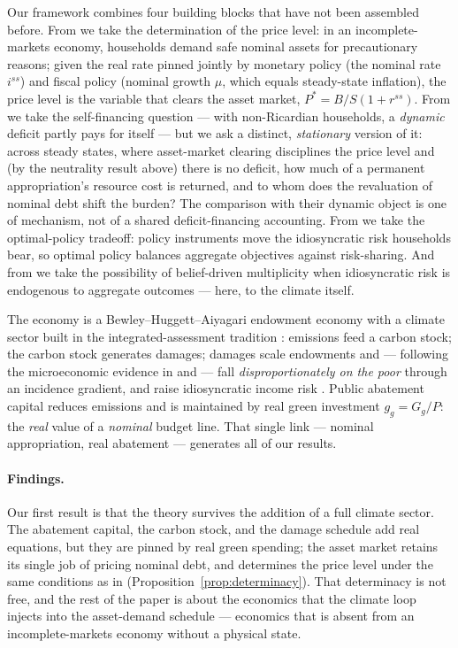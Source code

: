 \documentclass[12pt]{article}
\newcommand{\Sfun}{S}
\begin{document}
Our framework combines four building blocks that have not been assembled
before. From \citet{hagedorn2026dtpl} we take the determination of the price
level: in an incomplete-markets economy, households demand safe nominal assets
for precautionary reasons; given the real rate pinned jointly by monetary
policy (the nominal rate $i^{ss}$) and fiscal policy (nominal growth $\mu$,
which equals steady-state inflation), the price level is the variable that
clears the asset market, $P^{*}=B/\Sfun(1+r^{ss})$. From
\citet{angeletos2024deficits} we take the self-financing question --- with
non-Ricardian households, a \emph{dynamic} deficit partly pays for itself ---
but we ask a distinct, \emph{stationary} version of it: across steady states,
where asset-market clearing disciplines the price level and (by the neutrality
result above) there is no deficit, how much of a permanent appropriation's
resource cost is returned, and to whom does the revaluation of nominal debt
shift the burden? The comparison with their dynamic object is one of
mechanism, not of a shared deficit-financing accounting. From \citet{acharya2023optimal} we take the optimal-policy tradeoff:
policy instruments move the idiosyncratic risk households bear, so optimal
policy balances aggregate objectives against risk-sharing. And from
\citet{acharyabenhabib2024} we take the possibility of belief-driven
multiplicity when idiosyncratic risk is endogenous to aggregate outcomes ---
here, to the climate itself.

The economy is a Bewley--Huggett--Aiyagari endowment economy
\citep{bewley1980,huggett1993,aiyagari1994} with a climate sector built in the
integrated-assessment tradition \citep{golosov2014,nordhaus2017}: emissions
feed a carbon stock; the carbon stock generates damages; damages scale
endowments and --- following the microeconomic evidence in
\citet{kanzig2023carbon} and \citet{fried2018} --- fall
\emph{disproportionately on the poor} through an incidence gradient, and raise
idiosyncratic income risk \citep{bilalkanzig2024}. Public abatement capital
reduces emissions and is maintained by real green investment
$g_g = G_g/P$: the \emph{real} value of a \emph{nominal} budget line. That
single link --- nominal appropriation, real abatement --- generates all of our
results.

\paragraph{Findings.} Our first result is that the theory survives the
addition of a full climate sector. The abatement capital, the carbon stock,
and the damage schedule add real equations, but they are pinned by real green
spending; the asset market retains its single job of pricing nominal debt, and
determines the price level under the same conditions as in
\citet{hagedorn2026dtpl} (Proposition~\ref{prop:determinacy}). That
determinacy is not free, and the rest of the paper is about the economics that
the climate loop injects into the asset-demand schedule --- economics that
is absent from an incomplete-markets economy without a physical state.
\end{document}
